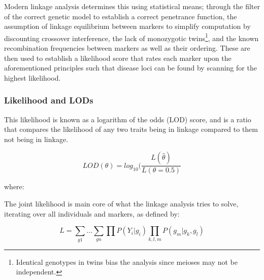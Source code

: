 Modern linkage analysis determines this using statistical means; through the filter of the correct genetic model to establish a correct penetrance function,  the assumption of linkage equilibrium between markers to simplify computation by discounting crossover interference, the lack of monozygotic twins\footnote{Identical genotypes in twins bias the analysis since meioses may not be independent.}, and the known recombination frequencies between markers as well as their ordering. These are then used to establish a likelihood score that rates each marker upon the aforementioned principles such that disease loci can be found by scanning for the highest likelihood.

\subsubsection{Likelihood and LODs}

This likelihood is known as a logarithm of the odds (\gls{LOD}) score, and is a ratio  that compares the likelihood of any two traits being in linkage compared to them not being in linkage. 

\begin{equation}
LOD(\theta) = log_{10} (\frac{L(\hat{\theta})}{L(\theta = 0.5)}
\end{equation}

where:
\begin{itemize}[labelsep=2em, align=right, labelwidth=3em, labelindent=4em, leftmargin=*]
\end{itemize}

The joint likelihood is main core of what the linkage analysis tries to solve, iterating over all individuals and markers, as defined by:


\begin{equation}
L = \sum_{g1} \dots \sum_{gn} \prod P(Y_i|g_i) \prod_{k,l,m} P(g_m|g_k,g_l)
\end{equation}

